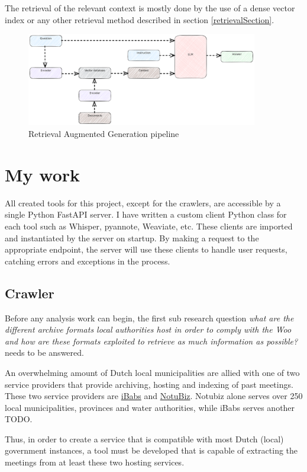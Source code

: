 \documentclass[twoside]{uva-inf-bachelor-thesis}
\begin{document}
The retrieval of the relevant context is mostly done by the use of a dense vector index or any other retrieval method described in section \ref{retrievalSection}.

\begin{figure}
    \centering
    \includegraphics[width=0.9\textwidth]{images/rag.png}
    \caption{Retrieval Augmented Generation pipeline}
    \label{fig:pyanres}
\end{figure}


\chapter{My work}
All created tools for this project, except for the crawlers, are accessible by a single Python FastAPI server. I have written a custom client Python class for each tool such as Whisper, pyannote, Weaviate, etc. These clients are imported and instantiated by the server on startup. By making a request to the appropriate endpoint, the server will use these clients to handle user requests, catching errors and exceptions in the process.


\section{Crawler}
Before any analysis work can begin, the first sub research question \textit{what are the different archive formats local authorities host in order to comply with the Woo and how are these formats exploited to retrieve as much information as possible?} needs to be answered. 

An overwhelming amount of Dutch local municipalities are allied with one of two service providers that provide archiving, hosting and indexing of past meetings. These two service providers are \href{https://www.ibabs.com}{iBabs} and \href{https://www.notubiz.nl/}{NotuBiz}. Notubiz alone serves over 250 local municipalities, provinces and water authorities, while iBabs serves another TODO. 

Thus, in order to create a service that is compatible with most Dutch (local) government instances, a tool must be developed that is capable of extracting the meetings from at least these two hosting services.
\end{document}
